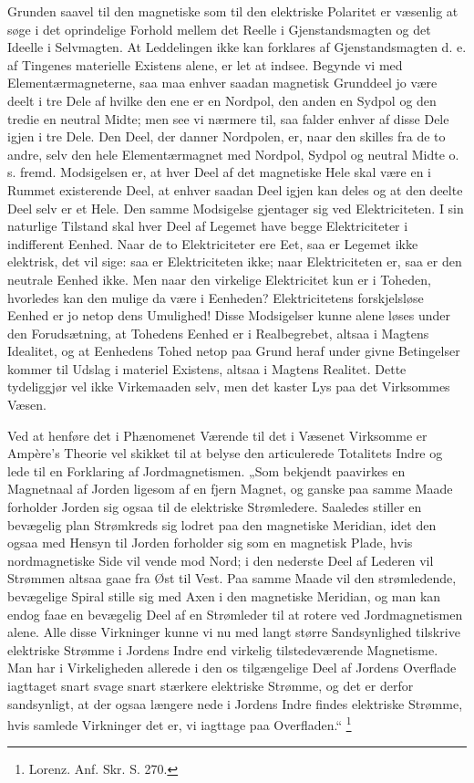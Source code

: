 \documentclass[12pt,a4paper]{book}
\begin{document}
Grunden saavel til den magnetiske som til den elektriske Polaritet er
væsenlig at søge i det oprindelige Forhold mellem det Reelle i
Gjenstandsmagten og det Ideelle i Selvmagten. At Leddelingen ikke kan
forklares af Gjenstandsmagten d. e. af Tingenes materielle Existens
alene, er let at indsee. Begynde vi med Elementærmagneterne, saa maa
enhver saadan magnetisk Grunddeel jo være deelt i tre Dele af hvilke
den ene er en Nordpol, den anden en Sydpol og den tredie en neutral
Midte; men see vi nærmere til, saa falder enhver af disse Dele igjen i
tre Dele. Den Deel, der danner Nordpolen, er, naar den skilles fra de
to andre, selv den hele Elementærmagnet med Nordpol, Sydpol og neutral
Midte o. s. fremd. Modsigelsen er, at hver Deel af det magnetiske Hele
skal være en i Rummet existerende Deel, at enhver saadan Deel igjen
kan deles og at den deelte Deel selv er et Hele. Den samme Modsigelse
gjentager sig ved Elektriciteten. I sin naturlige Tilstand skal hver
Deel af Legemet have begge Elektriciteter i indifferent Eenhed. Naar
de to Elektriciteter ere Eet, saa er Legemet ikke elektrisk, det vil
sige: saa er Elektriciteten ikke; naar Elektriciteten er, saa er den
neutrale Eenhed ikke. Men naar den virkelige Elektricitet kun er i
Toheden, hvorledes kan den mulige da være i Eenheden? Elektricitetens
forskjelsløse Eenhed er jo netop dens Umulighed! Disse Modsigelser
kunne alene løses under den Forudsætning, at Tohedens Eenhed er i
Realbegrebet, altsaa i Magtens Idealitet, og at Eenhedens Tohed netop
paa Grund heraf under givne Betingelser kommer til Udslag i materiel
Existens, altsaa i Magtens Realitet. Dette tydeliggjør vel ikke
Virkemaaden selv, men det kaster Lys paa det Virksommes Væsen.

Ved at henføre det i Phænomenet Værende til det i Væsenet Virksomme er
Ampère's Theorie vel skikket til at belyse den articulerede
Totalitets Indre og lede til en Forklaring af Jordmagnetismen.
„Som bekjendt paavirkes en
Magnetnaal af Jorden ligesom af en fjern Magnet, og ganske paa samme
Maade forholder Jorden sig ogsaa til de elektriske Strømledere.
Saaledes stiller en bevægelig plan Strømkreds sig lodret paa den
magnetiske Meridian, idet den ogsaa med Hensyn til Jorden forholder
sig som en magnetisk Plade, hvis nordmagnetiske Side vil vende mod
Nord; i den nederste Deel af Lederen vil Strømmen altsaa gaae fra Øst
til Vest. Paa samme Maade vil den strømledende, bevægelige Spiral
stille sig med Axen i den magnetiske Meridian, og man kan endog faae
en bevægelig Deel af en Strømleder til at rotere ved Jordmagnetismen
alene. Alle disse Virkninger kunne vi nu med langt større
Sandsynlighed tilskrive elektriske Strømme i Jordens Indre end
virkelig tilstedeværende Magnetisme. Man har i Virkeligheden allerede
i den os tilgængelige Deel af Jordens Overflade iagttaget snart svage
snart stærkere elektriske Strømme, og det er derfor sandsynligt, at
der ogsaa længere nede i Jordens Indre findes elektriske Strømme, hvis
samlede Virkninger det er, vi iagttage paa Overfladen.“ %
\footnote{%
Lorenz. Anf. Skr. S. 270.}
\end{document}
